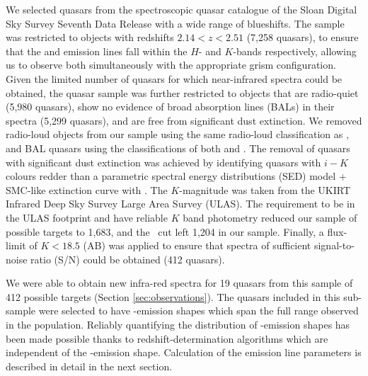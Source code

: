 We selected quasars from the spectroscopic quasar catalogue of the Sloan Digital Sky Survey \citep[SDSS;][]{york00} Seventh Data Release \citep[DR7;][]{schneider10} with a wide range of  blueshifts. 
The sample was restricted to objects with redshifts $2.14 < z <2.51$ (7,258 quasars), to ensure that the \hb and \ha emission lines fall within the $H$- and $K$-bands respectively, allowing us to observe both simultaneously with the appropriate grism configuration.
Given the limited number of quasars for which near-infrared spectra could be obtained, the quasar sample was further restricted to objects that are radio-quiet (5,980 quasars), show no evidence of broad absorption lines (BALs) in their spectra (5,299 quasars), and are free from significant dust extinction. 
We removed radio-loud objects from our sample using the same radio-loud classification as \citet{shen11}, and BAL quasars using the classifications of both \citet{shen11} and \citet{allen11}. 
The removal of quasars with significant dust extinction was achieved by identifying quasars with $i-K$ colours redder than a parametric spectral energy distributions (SED) model + SMC-like extinction curve with  \citep[see][]{maddox12}.
The $K$-magnitude was taken from the UKIRT Infrared Deep Sky Survey \citep[UKIDSS;][]{lawrence07} Large Area Survey (ULAS). 
The requirement to be in the ULAS footprint and have reliable $K$ band photometry reduced our sample of possible targets to 1,683, and the \ebv\, cut left 1,204 in our sample. 
Finally, a flux-limit of $K<18.5$ (AB) was applied to ensure that spectra of sufficient signal-to-noise ratio (S/N) could be obtained (412 quasars). 
 
We were able to obtain new infra-red spectra for 19 quasars from this sample of 412 possible targets (Section \ref{sec:observations}). 
The quasars included in this sub-sample were selected to have -emission shapes which span the full range observed in the population.
Reliably quantifying the distribution of -emission shapes has been made possible thanks to redshift-determination algorithms \citep[][Allen \& Hewett 2016, in preparation]{hewett10} which are independent of the -emission shape. 
Calculation of the  emission line parameters is described in detail in the next section. 

